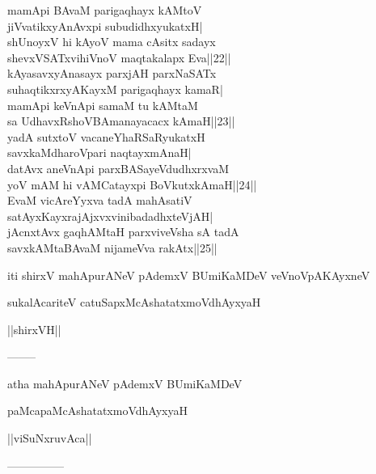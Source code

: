 \documentclass{article}
\begin{document}
mamApi BAvaM parigaqhayx kAMtoV\\
jiVvatikxyAnAvxpi subudidhxyukatxH|\\
shUnoyxV hi kAyoV mama cAsitx sadayx\\
shevxVSATxvihiVnoV maqtakalapx Eva||22||\\
kAyasavxyAnasayx parxjAH parxNaSATx\\
suhaqtikxrxyAKayxM parigaqhayx kamaR|\\
mamApi keVnApi samaM tu kAMtaM\\
sa UdhavxRshoVBAmanayacacx kAmaH||23||\\
yadA sutxtoV vacaneYhaRSaRyukatxH\\
savxkaMdharoVpari naqtayxmAnaH|\\
datAvx aneVnApi parxBASayeVdudhxrxvaM\\
yoV mAM hi vAMCatayxpi BoVkutxkAmaH||24||\\
EvaM vicAreYyxva tadA mahAsatiV\\
satAyxKayxrajAjxvxvinibadadhxteVjAH|\\
jAcnxtAvx gaqhAMtaH parxviveVsha sA tadA\\
savxkAMtaBAvaM nijameVva rakAtx||25||

\begin{center}
iti shirxV mahApurANeV pAdemxV BUmiKaMDeV veVnoVpAKAyxneV
\end{center}

\begin{center}
sukalAcariteV catuSapxMcAshatatxmoVdhAyxyaH
\end{center}

\begin{center}
||shirxVH||
\end{center}

\begin{center}
--------
\end{center}

\begin{center}
atha mahApurANeV pAdemxV BUmiKaMDeV
\end{center}

\begin{center}
paMcapaMcAshatatxmoVdhAyxyaH
\end{center}

\begin{center}
||viSuNxruvAca||
\end{center}

\begin{center}

---------------
\end{center}
\end{document}
